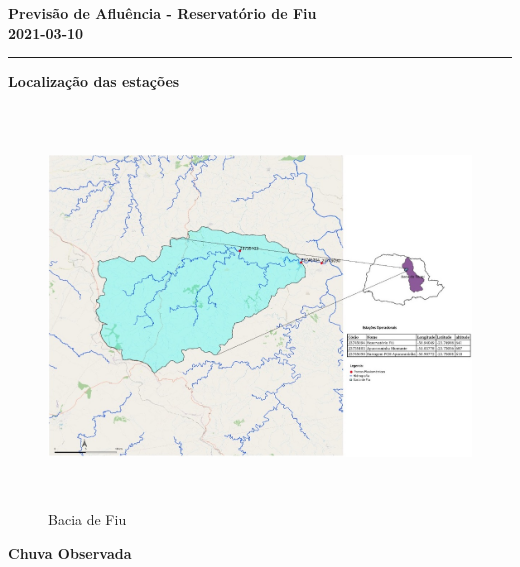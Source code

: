 \documentclass[a4paper,12pt]{article}
\begin{document}
\pagestyle{fancy}
\renewcommand{\headrulewidth}{1pt}
\begin{center}
\vspace{10pt}
\Large{\textbf{Previsão de Afluência - Reservatório de Fiu}}\\
\Large{\textbf{2021-03-10}}
\noindent
\rule{\textwidth}{1pt}
\end{center}

\vspace{6pt}
\textbf{\large{Localização das estações}}

\begin{figure}[ht]
    \centering
    \includegraphics[height=300pt]{area_fiu.jpeg}
    \vspace{6pt}
    \caption{Bacia de Fiu}
\end{figure}

\vspace{6pt}
\textbf{\large{Chuva Observada}}
\end{document}

